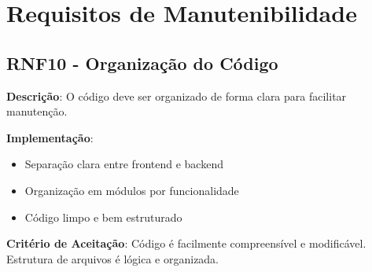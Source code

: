 \documentclass[12pt,a4paper]{article}
\begin{document}
\section{Requisitos de Manutenibilidade}

\subsection{RNF10 - Organização do Código}

\textbf{Descrição}: O código deve ser organizado de forma clara para facilitar manutenção.

\textbf{Implementação}:
\begin{itemize}
    \item Separação clara entre frontend e backend
    \item Organização em módulos por funcionalidade
    \item Código limpo e bem estruturado
\end{itemize}

\textbf{Critério de Aceitação}: Código é facilmente compreensível e modificável. Estrutura de arquivos é lógica e organizada.
\end{document}
